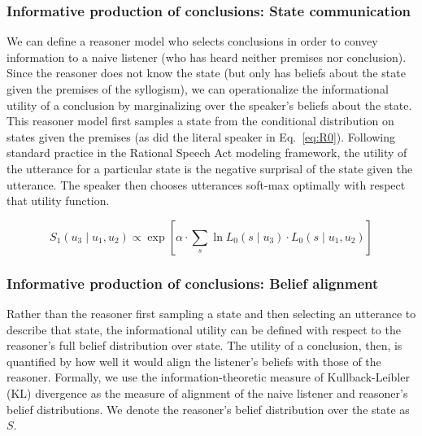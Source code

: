 \documentclass[floatsintext, doc]{apa6}
\newcommand{\mht}[1]{{\textcolor{Blue}{[mht: #1]}}}
\begin{document}
\subsubsection{Informative production of conclusions: State communication}

We can define a reasoner model who selects conclusions in order to convey information to a naive listener (who has heard neither premises nor conclusion). 
Since the reasoner does not know the state (but only has beliefs about the state given the premises of the syllogism), we can operationalize the informational utility of a conclusion by marginalizing over the speaker's beliefs about the state.
This reasoner model first samples a state from the conditional distribution on states given the premises (as did the literal speaker in Eq.~\ref{eq:R0}).
Following standard practice in the Rational Speech Act modeling framework, the utility of the utterance for a particular state is the negative surprisal of the state given the utterance.
The speaker then chooses utterances soft-max optimally with respect that utility function.

\begin{equation}
S_1(u_3 \mid u_1, u_2) \propto \exp{ [ \alpha \cdot  \sum_s  \ln L_0(s \mid u_3) \cdot L_0(s \mid u_1, u_2) ] } \label{eq:R1a}
\end{equation}


\subsubsection{Informative production of conclusions: Belief alignment}

Rather than the reasoner first sampling a state and then selecting an utterance to describe that state, the informational utility can be defined with respect to the reasoner's full belief distribution over state. 
The utility of a conclusion, then, is quantified by how well it would align the listener's beliefs with those of the reasoner. 
Formally, we use the information-theoretic measure of Kullback-Leibler (KL) divergence as the measure of alignment of the naive listener and reasoner's belief distributions. 
We denote the reasoner's belief distribution over the state as $S$.
\end{document}
